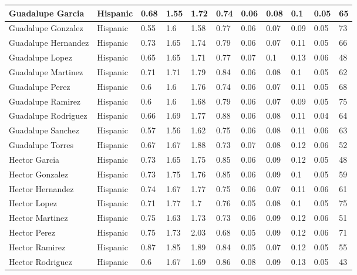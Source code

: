 \begin{table}[!ht]
\begin{tabular}{|l|l|l|l|l|l|l|l|l|l|l|}
        Guadalupe Garcia & Hispanic & 0.68 & 1.55 & 1.72 & 0.74 & 0.06 & 0.08 & 0.1 & 0.05 & 65 \\ \hline
        Guadalupe Gonzalez & Hispanic & 0.55 & 1.6 & 1.58 & 0.77 & 0.06 & 0.07 & 0.09 & 0.05 & 73 \\ \hline
        Guadalupe Hernandez & Hispanic & 0.73 & 1.65 & 1.74 & 0.79 & 0.06 & 0.07 & 0.11 & 0.05 & 66 \\ \hline
        Guadalupe Lopez & Hispanic & 0.65 & 1.65 & 1.71 & 0.77 & 0.07 & 0.1 & 0.13 & 0.06 & 48 \\ \hline
        Guadalupe Martinez & Hispanic & 0.71 & 1.71 & 1.79 & 0.84 & 0.06 & 0.08 & 0.1 & 0.05 & 62 \\ \hline
        Guadalupe Perez & Hispanic & 0.6 & 1.6 & 1.76 & 0.74 & 0.06 & 0.07 & 0.11 & 0.05 & 68 \\ \hline
        Guadalupe Ramirez & Hispanic & 0.6 & 1.6 & 1.68 & 0.79 & 0.06 & 0.07 & 0.09 & 0.05 & 75 \\ \hline
        Guadalupe Rodriguez & Hispanic & 0.66 & 1.69 & 1.77 & 0.88 & 0.06 & 0.08 & 0.11 & 0.04 & 64 \\ \hline
        Guadalupe Sanchez & Hispanic & 0.57 & 1.56 & 1.62 & 0.75 & 0.06 & 0.08 & 0.11 & 0.06 & 63 \\ \hline
        Guadalupe Torres & Hispanic & 0.67 & 1.67 & 1.88 & 0.73 & 0.07 & 0.08 & 0.12 & 0.06 & 52 \\ \hline
        Hector Garcia & Hispanic & 0.73 & 1.65 & 1.75 & 0.85 & 0.06 & 0.09 & 0.12 & 0.05 & 48 \\ \hline
        Hector Gonzalez & Hispanic & 0.73 & 1.75 & 1.76 & 0.85 & 0.06 & 0.09 & 0.1 & 0.05 & 59 \\ \hline
        Hector Hernandez & Hispanic & 0.74 & 1.67 & 1.77 & 0.75 & 0.06 & 0.07 & 0.11 & 0.06 & 61 \\ \hline
        Hector Lopez & Hispanic & 0.71 & 1.77 & 1.7 & 0.76 & 0.05 & 0.08 & 0.1 & 0.05 & 75 \\ \hline
        Hector Martinez & Hispanic & 0.75 & 1.63 & 1.73 & 0.73 & 0.06 & 0.09 & 0.12 & 0.06 & 51 \\ \hline
        Hector Perez & Hispanic & 0.75 & 1.73 & 2.03 & 0.68 & 0.05 & 0.09 & 0.12 & 0.06 & 71 \\ \hline
        Hector Ramirez & Hispanic & 0.87 & 1.85 & 1.89 & 0.84 & 0.05 & 0.07 & 0.12 & 0.05 & 55 \\ \hline
        Hector Rodriguez & Hispanic & 0.6 & 1.67 & 1.69 & 0.86 & 0.08 & 0.09 & 0.13 & 0.05 & 43 \\ \hline

\end{tabular}
\end{table}
